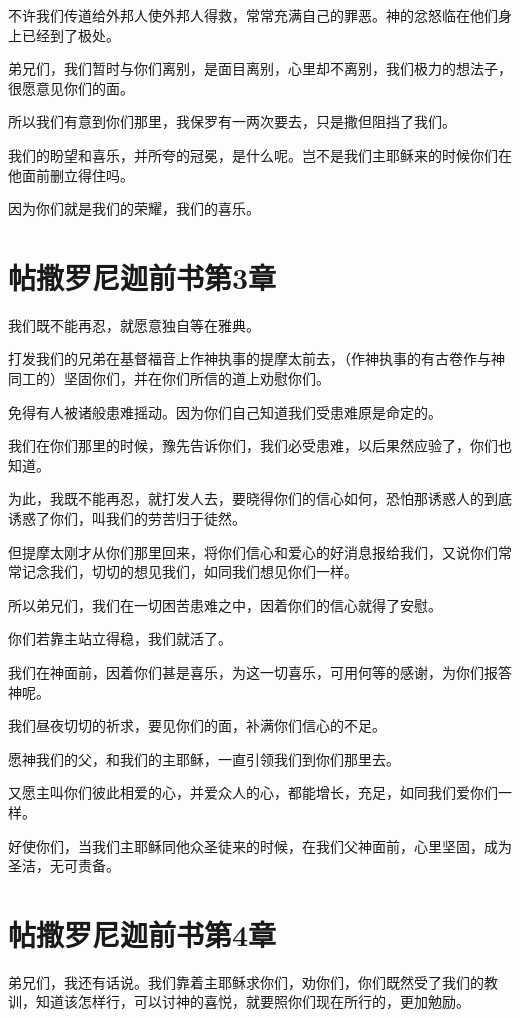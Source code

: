 \documentclass[12pt,oneside]{book}
\begin{document}
不许我们传道给外邦人使外邦人得救，常常充满自己的罪恶。神的忿怒临在他们身上已经到了极处。

弟兄们，我们暂时与你们离别，是面目离别，心里却不离别，我们极力的想法子，很愿意见你们的面。

所以我们有意到你们那里，我保罗有一两次要去，只是撒但阻挡了我们。

我们的盼望和喜乐，并所夸的冠冕，是什么呢。岂不是我们主耶稣来的时候你们在他面前删立得住吗。

因为你们就是我们的荣耀，我们的喜乐。

\chapter{帖撒罗尼迦前书第3章}
我们既不能再忍，就愿意独自等在雅典。

打发我们的兄弟在基督福音上作神执事的提摩太前去，（作神执事的有古卷作与神同工的）坚固你们，并在你们所信的道上劝慰你们。

免得有人被诸般患难摇动。因为你们自己知道我们受患难原是命定的。

我们在你们那里的时候，豫先告诉你们，我们必受患难，以后果然应验了，你们也知道。

为此，我既不能再忍，就打发人去，要晓得你们的信心如何，恐怕那诱惑人的到底诱惑了你们，叫我们的劳苦归于徒然。

但提摩太刚才从你们那里回来，将你们信心和爱心的好消息报给我们，又说你们常常记念我们，切切的想见我们，如同我们想见你们一样。

所以弟兄们，我们在一切困苦患难之中，因着你们的信心就得了安慰。

你们若靠主站立得稳，我们就活了。

我们在神面前，因着你们甚是喜乐，为这一切喜乐，可用何等的感谢，为你们报答神呢。

我们昼夜切切的祈求，要见你们的面，补满你们信心的不足。

愿神我们的父，和我们的主耶稣，一直引领我们到你们那里去。

又愿主叫你们彼此相爱的心，并爱众人的心，都能增长，充足，如同我们爱你们一样。

好使你们，当我们主耶稣同他众圣徒来的时候，在我们父神面前，心里坚固，成为圣洁，无可责备。

\chapter{帖撒罗尼迦前书第4章}
弟兄们，我还有话说。我们靠着主耶稣求你们，劝你们，你们既然受了我们的教训，知道该怎样行，可以讨神的喜悦，就要照你们现在所行的，更加勉励。
\end{document}
